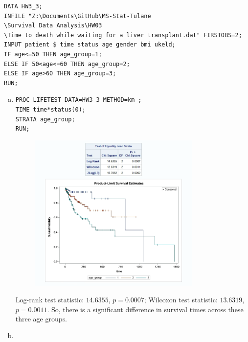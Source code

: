 \documentclass[12pt]{elegantbook}
\begin{document}
    \begin{solution}
        \begin{verbatim}
DATA HW3_3;
INFILE "Z:\Documents\GitHub\MS-Stat-Tulane
\Survival Data Analysis\HW03
\Time to death while waiting for a liver transplant.dat" FIRSTOBS=2;
INPUT patient $ time status age gender bmi ukeld; 
IF age<=50 THEN age_group=1; 
ELSE IF 50<age<=60 THEN age_group=2; 
ELSE IF age>60 THEN age_group=3; 
RUN;
        \end{verbatim}
    \begin{enumerate}[(a)]
        \item \label{pa}\begin{verbatim}
PROC LIFETEST DATA=HW3_3 METHOD=km ;
TIME time*status(0);
STRATA age_group;
RUN;
        \end{verbatim}
        \begin{figure}[H]
            \centering
            \includegraphics[width=0.8\textwidth]{HW3_3a.png}
        \end{figure}
        Log-rank test statistic: $14.6355$, $p=0.0007$; Wilcoxon test statistic: $13.6319$, $p=0.0011$. So, there is a significant difference in survival times across these three age groups. 
        \item \label{pb}\begin{verbatim}

\end{verbatim}
\end{enumerate}
\end{solution}
\end{document}
